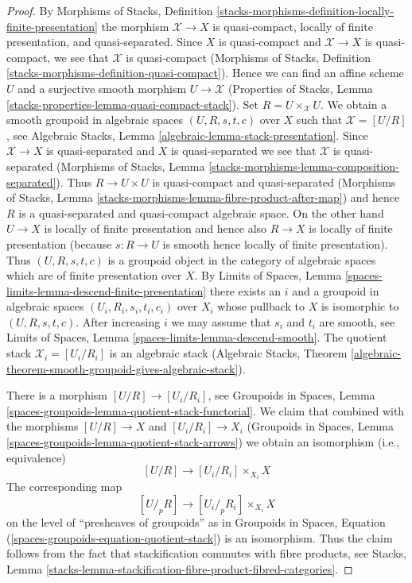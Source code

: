 \begin{proof}
By Morphisms of Stacks, Definition
\ref{stacks-morphisms-definition-locally-finite-presentation}
the morphism $\mathcal{X} \to X$ is
quasi-compact, locally of finite presentation, and quasi-separated.
Since $X$ is quasi-compact and $\mathcal{X} \to X$ is quasi-compact,
we see that $\mathcal{X}$ is quasi-compact
(Morphisms of Stacks, Definition
\ref{stacks-morphisms-definition-quasi-compact}).
Hence we can find an affine
scheme $U$ and a surjective smooth morphism $U \to \mathcal{X}$
(Properties of Stacks, Lemma
\ref{stacks-properties-lemma-quasi-compact-stack}).
Set $R = U \times_\mathcal{X} U$. We obtain a smooth groupoid
in algebraic spaces $(U, R, s, t, c)$ over $X$ such that
$\mathcal{X} = [U/R]$, see Algebraic Stacks, Lemma
\ref{algebraic-lemma-stack-presentation}.
Since $\mathcal{X} \to X$ is quasi-separated and $X$ is quasi-separated
we see that $\mathcal{X}$ is quasi-separated (Morphisms of Stacks, Lemma
\ref{stacks-morphisms-lemma-composition-separated}).
Thus $R \to U \times U$ is quasi-compact and quasi-separated
(Morphisms of Stacks, Lemma
\ref{stacks-morphisms-lemma-fibre-product-after-map})
and hence $R$ is a quasi-separated and quasi-compact algebraic space.
On the other hand $U \to X$ is locally of finite presentation
and hence also $R \to X$ is locally of finite presentation
(because $s : R \to U$ is smooth hence locally of finite presentation).
Thus $(U, R, s, t, c)$ is a groupoid object in the category
of algebraic spaces which are of finite presentation over $X$.
By Limits of Spaces, Lemma
\ref{spaces-limits-lemma-descend-finite-presentation}
there exists an $i$ and a groupoid in algebraic spaces
$(U_i, R_i, s_i, t_i, c_i)$ over $X_i$ whose pullback
to $X$ is isomorphic to $(U, R, s, t, c)$.
After increasing $i$ we may assume that
$s_i$ and $t_i$ are smooth, see
Limits of Spaces, Lemma \ref{spaces-limits-lemma-descend-smooth}.
The quotient stack $\mathcal{X}_i = [U_i/R_i]$
is an algebraic stack (Algebraic Stacks, Theorem
\ref{algebraic-theorem-smooth-groupoid-gives-algebraic-stack}).

\medskip\noindent
There is a morphism $[U/R] \to [U_i/R_i]$, see
Groupoids in Spaces, Lemma
\ref{spaces-groupoids-lemma-quotient-stack-functorial}.
We claim that combined with the morphisms
$[U/R] \to X$ and $[U_i/R_i] \to X_i$
(Groupoids in Spaces, Lemma \ref{spaces-groupoids-lemma-quotient-stack-arrows})
we obtain an isomorphism (i.e., equivalence)
$$
[U/R] \longrightarrow [U_i/R_i] \times_{X_i} X
$$
The corresponding map
$$
[U/_{\!p}R] \longrightarrow [U_i/_{\!p}R_i] \times_{X_i} X
$$
on the level of ``presheaves of groupoids'' as in
Groupoids in Spaces, Equation (\ref{spaces-groupoids-equation-quotient-stack})
is an isomorphism. Thus the claim follows from the fact that
stackification commutes with fibre products, see Stacks, Lemma
\ref{stacks-lemma-stackification-fibre-product-fibred-categories}.
\end{proof}




